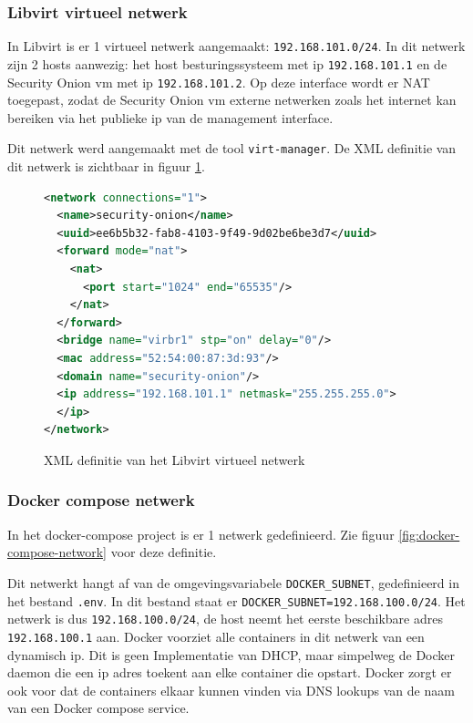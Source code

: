 \documentclass[a4paper,12pt]{report}
\begin{document}
\subsubsection{Libvirt virtueel netwerk}
In Libvirt is er 1 virtueel netwerk aangemaakt: \lstinline|192.168.101.0/24|.
In dit netwerk zijn 2 hosts aanwezig: het host besturingssysteem met ip \lstinline|192.168.101.1| en de Security Onion vm met ip \lstinline|192.168.101.2|.
Op deze interface wordt er NAT toegepast, zodat de Security Onion vm externe netwerken zoals het internet kan bereiken via het publieke ip van de management interface.

Dit netwerk werd aangemaakt met de tool \lstinline|virt-manager|.
De XML definitie van dit netwerk is zichtbaar in figuur \ref{fig:libvirt-network-xml}.

\begin{figure}[H]
  \begin{lstlisting}[language=XML]
<network connections="1">
  <name>security-onion</name>
  <uuid>ee6b5b32-fab8-4103-9f49-9d02be6be3d7</uuid>
  <forward mode="nat">
    <nat>
      <port start="1024" end="65535"/>
    </nat>
  </forward>
  <bridge name="virbr1" stp="on" delay="0"/>
  <mac address="52:54:00:87:3d:93"/>
  <domain name="security-onion"/>
  <ip address="192.168.101.1" netmask="255.255.255.0">
  </ip>
</network>
  \end{lstlisting}
  \caption{XML definitie van het Libvirt virtueel netwerk}
  \label{fig:libvirt-network-xml}
\end{figure}

\subsubsection{Docker compose netwerk}
In het docker-compose project is er 1 netwerk gedefinieerd.
Zie figuur \ref{fig:docker-compose-network} voor deze definitie.

Dit netwerkt hangt af van de omgevingsvariabele \lstinline|DOCKER_SUBNET|, gedefinieerd in het bestand \lstinline|.env|.
In dit bestand staat er \lstinline|DOCKER_SUBNET=192.168.100.0/24|.
Het netwerk is dus \lstinline|192.168.100.0/24|, de host neemt het eerste beschikbare adres \lstinline|192.168.100.1| aan.
Docker voorziet alle containers in dit netwerk van een dynamisch ip.
Dit is geen Implementatie van DHCP, maar simpelweg de Docker daemon die een ip adres toekent aan elke container die opstart.
Docker zorgt er ook voor dat de containers elkaar kunnen vinden via DNS lookups van de naam van een Docker compose service. 
\end{document}
